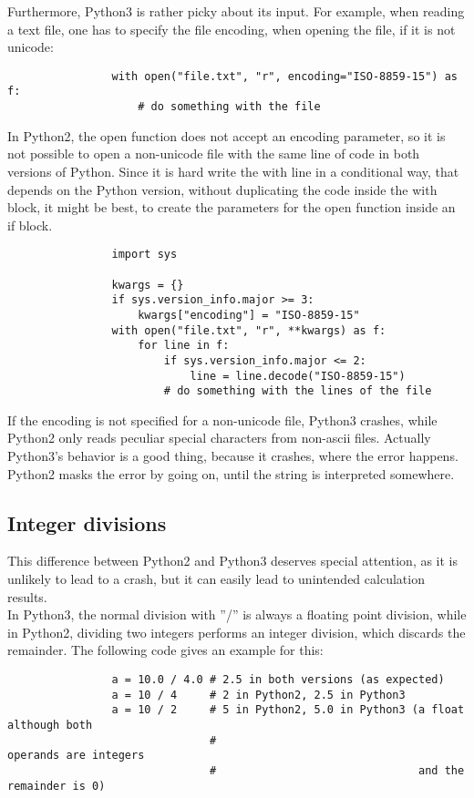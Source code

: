 			Furthermore, Python3 is rather picky about its input.
			For example, when reading a text file, one has to specify the file encoding, when opening the file, if it is not unicode:
			\begin{verbatim}
				with open("file.txt", "r", encoding="ISO-8859-15") as f:
					# do something with the file
			\end{verbatim}
			In Python2, the {\normalfont \ttfamily open} function does not accept an {\normalfont \ttfamily encoding} parameter, so it is not possible to open a non-unicode file with the same line of code in both versions of Python.
			Since it is hard write the {\normalfont \ttfamily with} line in a conditional way, that depends on the Python version, without duplicating the code inside the {\normalfont \ttfamily with} block, it might be best, to create the parameters for the {\normalfont \ttfamily open} function inside an {\normalfont \ttfamily if} block.
			\begin{verbatim}
				import sys

				kwargs = {}
				if sys.version_info.major >= 3:
					kwargs["encoding"] = "ISO-8859-15"
				with open("file.txt", "r", **kwargs) as f:
					for line in f:
						if sys.version_info.major <= 2:
							line = line.decode("ISO-8859-15")
						# do something with the lines of the file
			\end{verbatim}

			If the encoding is not specified for a non-unicode file, Python3 crashes, while Python2 only reads peculiar special characters from non-ascii files.
			Actually Python3's behavior is a good thing, because it crashes, where the error happens.
			Python2 masks the error by going on, until the string is interpreted somewhere.

		\subsection{Integer divisions}
			This difference between Python2 and Python3 deserves special attention, as it is unlikely to lead to a crash, but it can easily lead to unintended calculation results.\\
			In Python3, the normal division with ''/'' is always a floating point division, while in Python2, dividing two integers performs an integer division, which discards the remainder.
			The following code gives an example for this:
			\begin{verbatim}
				a = 10.0 / 4.0 # 2.5 in both versions (as expected)
				a = 10 / 4     # 2 in Python2, 2.5 in Python3
				a = 10 / 2     # 5 in Python2, 5.0 in Python3 (a float although both
				               #                               operands are integers
				               #                               and the remainder is 0)
			\end{verbatim}

